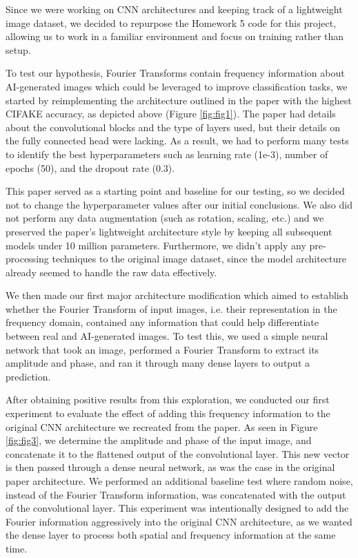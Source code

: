 Since we were working on CNN architectures and keeping track of a lightweight image dataset, we decided to repurpose the Homework 5 code for this project, allowing us to work in a familiar environment and focus on training rather than setup.

To test our hypothesis, Fourier Transforms contain frequency information about AI-generated images which could be leveraged to improve classification tasks, we started by reimplementing the architecture outlined in the paper with the highest CIFAKE accuracy, as depicted above (Figure \ref{fig:fig1}). The paper had details about the convolutional blocks and the type of layers used, but their details on the fully connected head were lacking. As a result, we had to perform many tests to identify the best hyperparameters such as learning rate (1e-3), number of epochs (50), and the dropout rate (0.3).

This paper served as a starting point and baseline for our testing, so we decided not to change the hyperparameter values after our initial conclusions. We also did not perform any data augmentation (such as rotation, scaling, etc.) and we preserved the paper’s lightweight architecture style by keeping all subsequent models under 10 million parameters. Furthermore, we didn’t apply any pre-processing techniques to the original image dataset, since the model architecture already seemed to handle the raw data effectively.

We then made our first major architecture modification which aimed to establish whether the Fourier Transform of input images, i.e. their representation in the frequency domain, contained any information that could help differentiate between real and AI-generated images. To test this, we used a simple neural network that took an image, performed a Fourier Transform to extract its amplitude and phase, and ran it through many dense layers to output a prediction.

After obtaining positive results from this exploration, we conducted our first experiment to evaluate the effect of adding this frequency information to the original CNN architecture we recreated from the paper. As seen in Figure \ref{fig:fig3}, we determine the amplitude and phase of the input image, and concatenate it to the flattened output of the convolutional layer. This new vector is then passed through a dense neural network, as was the case in the original paper architecture. We performed an additional baseline test where random noise, instead of the Fourier Transform information, was concatenated with the output of the convolutional layer. This experiment was intentionally designed to add the Fourier information aggressively into the original CNN architecture, as we wanted the dense layer to process both spatial and frequency information at the same time.


